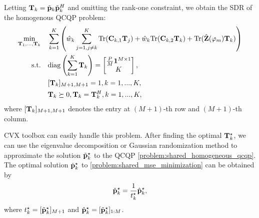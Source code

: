 Letting ${\bf T}_k = \tilde{\bf p}_k \tilde{\bf p}_k^H$ and omitting the rank-one constraint, we obtain the SDR of the 
homogenous QCQP problem:
\begin{subequations} \label{problem:shared_sdr}
    \begin{align} 
        \min_{{\bf T}_1,...,{\bf T}_k} \quad & \sum_{k=1}^K \left(\hat{w}_k \sum_{j=1,j\neq k}^K \mathrm{Tr}({\bf C}_{k,1} {\bf T}_j ) + \hat{w}_k \mathrm{Tr}({\bf C}_{k,2} {\bf T}_k) + \mathrm{Tr} (\hat{\bf Z}(\varphi_m) {\bf T}_k) \right) 
        \\ \mathrm{s.t.} \quad & \mathrm{diag}\left( \sum_{k=1}^K {\bf T}_k \right) = \begin{bmatrix} \frac{P}{M} {\bf 1}^{M \times 1} \\ K\end{bmatrix}, 
        \\ &[{\bf T}_k]_{M+1,M+1} = 1, k=1,...,K, 
        \\ & {\bf T}_k \succeq 0, {\bf T}_k = {\bf T}_k^H, k=1,...,K, 
    \end{align}
\end{subequations}
where $[{\bf T}_k]_{M+1,M+1}$ denotes the entry at $(M+1)$-th row and $(M+1)$-th column.

CVX toolbox can easily handle this problem.
After finding the optimal ${\bf T}_k^\star$, we can use the eigenvalue decomposition or Gaussian randomization method \cite{luo2010semidefinite} to approximate
the solution $\tilde{\bf p}_k^\star$ to the QCQP \eqref{problem:shared_homogeneous_qcqp}. The optimal solution $\check{\bf p}_k^\star$ to \eqref{problem:shared_mse_minimization} can be obtained by 
\begin{equation} \label{eqn:shared_optimal_precoder}
    \check{\bf p}_k^\star = \frac{1}{t^\star_k} \hat{\bf p}_k^\star,
\end{equation}
where $t^\star_k = [\tilde{\bf p}^\star_k]_{M+1}$ and $\hat{\bf p}_k^\star = [\tilde{\bf p}^\star_k]_{1:M}$.

